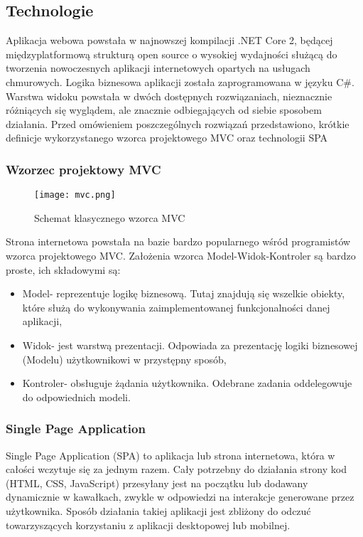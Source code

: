 \subsection{Technologie}
Aplikacja webowa powstała w najnowszej kompilacji .NET Core 2, będącej międzyplatformową strukturą open source o wysokiej wydajności służącą do tworzenia nowoczesnych aplikacji internetowych opartych na usługach chmurowych. Logika biznesowa aplikacji została zaprogramowana w języku C\#. Warstwa widoku powstała w dwóch dostępnych rozwiązaniach, nieznacznie różniących się wyglądem, ale znacznie odbiegających od siebie sposobem działania. Przed omówieniem poszczególnych rozwiązań przedstawiono, krótkie definicje wykorzystanego wzorca projektowego MVC oraz technologii SPA

\subsubsection{Wzorzec projektowy MVC}
\begin{figure}[H]
	\centering
	\texttt{[image: mvc.png]}
	\caption{Schemat klasycznego wzorca MVC}
	\label{fig:schemat_mvc}
\end{figure}
Strona internetowa powstała na bazie bardzo popularnego wśród programistów wzorca projektowego MVC. Założenia wzorca Model-Widok-Kontroler są bardzo proste, ich składowymi są:
\begin{itemize}
\item Model- reprezentuje logikę biznesową. Tutaj znajdują się wszelkie obiekty, które służą do wykonywania zaimplementowanej funkcjonalności danej aplikacji,
\item Widok- jest warstwą prezentacji. Odpowiada za prezentację logiki biznesowej (Modelu) użytkownikowi w przystępny sposób,
\item Kontroler- obsługuje żądania użytkownika. Odebrane zadania oddelegowuje do odpowiednich modeli.
\end{itemize}

\subsubsection{Single Page Application}
Single Page Application (SPA) to aplikacja lub strona internetowa, która w całości wczytuje się za jednym razem. Cały potrzebny do działania strony kod (HTML, CSS, JavaScript) przesyłany jest na początku lub dodawany dynamicznie w kawałkach, zwykle w odpowiedzi na interakcje generowane przez użytkownika.
Sposób działania takiej aplikacji jest zbliżony do odczuć towarzyszących korzystaniu z aplikacji desktopowej lub mobilnej. 

